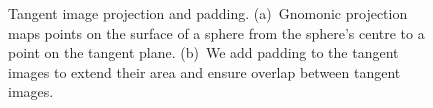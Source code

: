 \begin{figure}[hbt!]
	\begin{center}
	\end{center}
	\caption{\label{fig:approach:projection}%
		Tangent image projection and padding.
		(a)~Gnomonic projection maps points on the surface of a sphere from the sphere's centre to a point on the tangent plane.
		(b)~We add padding to the tangent images to extend their area and ensure overlap between tangent images.
	}
\end{figure}


